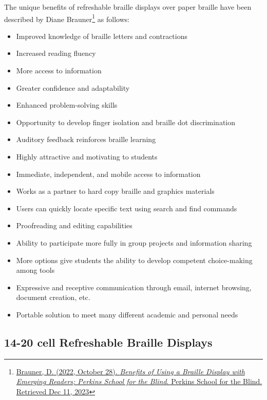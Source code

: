 \documentclass[14pt,letterpaper,twoside]{extreport}
\begin{document}
The unique benefits of refreshable braille displays over paper braille have been described by Diane Brauner\footnote{\href{https://www.perkins.org/resource/benefits-using-braille-display-emerging-readers/}{Brauner, D. (2022, October 28). \textit{Benefits of Using a Braille Display with Emerging Readers; Perkins School for the Blind}. Perkins School for the Blind. Retrieved Dec 11, 2023}} as follows: 
\begin{itemize}[leftmargin=*]
\item Improved knowledge of braille letters and contractions
\item Increased reading fluency
\item More access to information
\item Greater confidence and adaptability
\item Enhanced problem-solving skills
\item Opportunity to develop finger isolation and braille dot discrimination
\item Auditory feedback reinforces braille learning
\item Highly attractive and motivating to students
\item Immediate, independent, and mobile access to information
\item Works as a partner to hard copy braille and graphics materials
\item Users can quickly locate specific text using search and find commands
\item Proofreading and editing capabilities
\item Ability to participate more fully in group projects and information sharing
\item More options give students the ability to develop competent choice-making among tools
\item Expressive and receptive communication through email, internet browsing, document creation, etc.
\item Portable solution to meet many different academic and personal needs
\end{itemize}
\pagebreak \hypertarget{few-cell-refreshable-braille-displays}{%
	\subsection{14-20 cell Refreshable Braille
		Displays}\label{few-cell-refreshable-braille-displays}}
\end{document}
